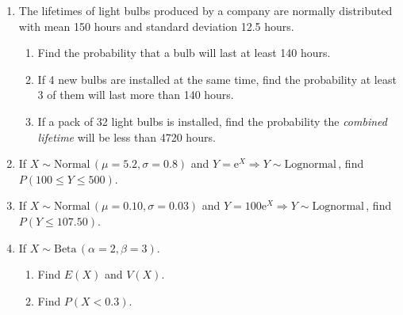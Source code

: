 \documentclass{article}
\newcommand{\follow}[1]{\sim \text{#1}\,}		%
\newcommand{\e}{\mathrm{e}}		%
\begin{document}
\begin{enumerate}
    \item The lifetimes of light bulbs produced by a company are normally distributed with mean 150 hours and standard deviation 12.5 hours.%
    \begin{enumerate}
        \item Find the probability that a bulb will last at least 140 hours.\vspace{70pt}
        \item If 4 new bulbs are installed at the same time, find the probability at least 3 of them will last more than 140 hours.\vspace{50pt}
        \item If a pack of 32 light bulbs is installed, find the probability the \textit{combined lifetime} will be less than 4720 hours.\vspace{90pt}
    \end{enumerate}
    
    \item If $X \follow{Normal}(\mu = 5.2, \sigma = 0.8)$ and $Y = \e^X \Longrightarrow Y \follow{Lognormal}$, find $P(100 \le Y \le 500)$.\vspace{90pt}%
    
     \item If $X \follow{Normal}(\mu = 0.10, \sigma = 0.03)$ and $Y = 100\e^X \Longrightarrow Y \follow{Lognormal}$, find $P(Y \le 107.50)$.\vspace{70pt}%
     
     \item If $X \follow{Beta}(\alpha = 2, \beta = 3)$.%
     \begin{enumerate}
         \item Find $E(X)$ and $V(X)$.\vspace{50pt}
         \item Find $P(X < 0.3)$.
     \end{enumerate}

\end{enumerate}
\end{document}
